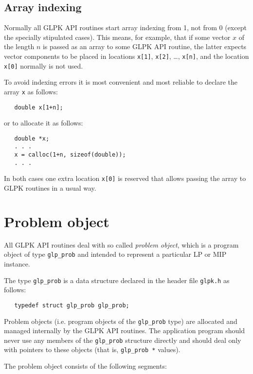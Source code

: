 \subsection{Array indexing}

Normally all GLPK API routines start array indexing from 1, not from 0
(except the specially stipulated cases). This means, for example, that
if some vector $x$ of the length $n$ is passed as an array to some GLPK
API routine, the latter expects vector components to be placed in
locations \verb|x[1]|, \verb|x[2]|, \dots, \verb|x[n]|, and the
location \verb|x[0]| normally is not used.

To avoid indexing errors it is most convenient and most reliable to
declare the array \verb|x| as follows:

\begin{verbatim}
   double x[1+n];
\end{verbatim}

\noindent
or to allocate it as follows:

\begin{verbatim}
   double *x;
   . . .
   x = calloc(1+n, sizeof(double));
   . . .
\end{verbatim}

\noindent
In both cases one extra location \verb|x[0]| is reserved that allows
passing the array to GLPK routines in a usual way.

\section{Problem object}

All GLPK API routines deal with so called {\it problem object}, which
is a program object of type \verb|glp_prob| and intended to represent
a particular LP or MIP instance.

The type \verb|glp_prob| is a data structure declared in the header
file \verb|glpk.h| as follows:

\begin{verbatim}
   typedef struct glp_prob glp_prob;
\end{verbatim}

Problem objects (i.e. program objects of the \verb|glp_prob| type) are
allocated and managed internally by the GLPK API routines. The
application program should never use any members of the \verb|glp_prob|
structure directly and should deal only with pointers to these objects
(that is, \verb|glp_prob *| values).

The problem object consists of the following segments:

